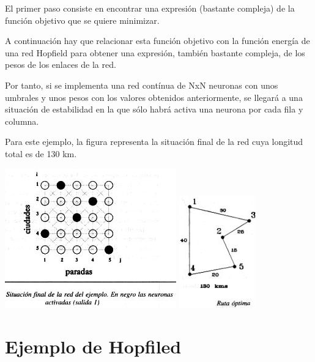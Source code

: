 \documentclass[letterpaper,12pt]{article}
\begin{document}
El primer paso consiste en encontrar una expresión (bastante compleja) de la función objetivo que se quiere minimizar.

A continuación hay que relacionar esta función objetivo con la función energía de una red Hopfield para obtener una expresión, también bastante compleja, de los pesos de los enlaces de la red.

Por tanto, si se implementa una red contínua de NxN neuronas con unos umbrales y unos pesos con los valores obtenidos anteriormente, se llegará a una situación de estabilidad en la que sólo habrá activa una neurona por cada fila y columna.

Para este ejemplo, la figura representa la situación final de la red cuya longitud total es de 130 km.

\begin{center}
    \includegraphics[scale = 0.5]{Imagenes/Ejemplo_Hopfield.jpg}
    \includegraphics[scale = 0.5]{Imagenes/Ejemplo_Hopfield2.jpg}
    \newline
\end{center}


\section{Ejemplo de Hopfiled}
\end{document}
